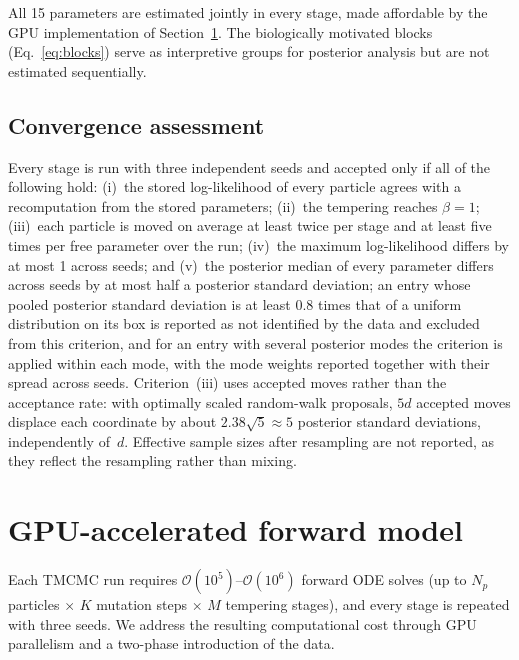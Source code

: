 \documentclass[pdflatex,sn-mathphys-ay,lineno]{sn-jnl}%
\begin{document}
All 15 parameters are estimated jointly in every stage, made affordable by the GPU implementation of Section~\ref{sec:gpu}.
The biologically motivated blocks (Eq.~\ref{eq:blocks}) serve as interpretive groups for posterior analysis but are not estimated sequentially.

\subsection{Convergence assessment}
\label{sec:convergence}

Every stage is run with three independent seeds and accepted only if all of the following hold:
(i)~the stored log-likelihood of every particle agrees with a recomputation from the stored parameters;
(ii)~the tempering reaches $\beta=1$;
(iii)~each particle is moved on average at least twice per stage and at least five times per free parameter over the run;
(iv)~the maximum log-likelihood differs by at most 1 across seeds; and
(v)~the posterior median of every parameter differs across seeds by at most half a posterior standard deviation; an entry whose pooled posterior standard deviation is at least 0.8 times that of a uniform distribution on its box is reported as not identified by the data and excluded from this criterion, and for an entry with several posterior modes the criterion is applied within each mode, with the mode weights reported together with their spread across seeds.
Criterion~(iii) uses accepted moves rather than the acceptance rate: with optimally scaled random-walk proposals, $5d$ accepted moves displace each coordinate by about $2.38\sqrt5\approx5$ posterior standard deviations, independently of~$d$.
Effective sample sizes after resampling are not reported, as they reflect the resampling rather than mixing.


\section{GPU-accelerated forward model}
\label{sec:gpu}

Each TMCMC run requires $\mathcal{O}(10^5)$--$\mathcal{O}(10^6)$ forward ODE solves (up to $N_p$ particles $\times$ $K$ mutation steps $\times$ $M$ tempering stages), and every stage is repeated with three seeds.
We address the resulting computational cost through GPU parallelism and a two-phase introduction of the data.
\end{document}
